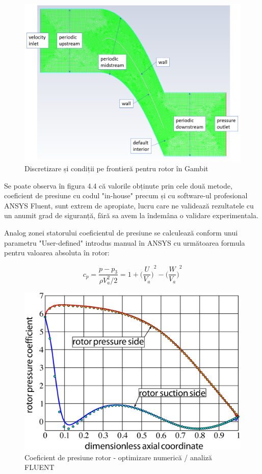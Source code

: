 \begin{figure}[h]
	\centering
	\includegraphics[scale=0.5]{figures/mesh-rotor-boundary.PNG}
	\caption{Discretizare și condiții pe frontieră pentru rotor în Gambit}
	\label{Discretizare și condiții pe frontieră pentru rotor în Gambit}
\end{figure}

Se poate observa în figura 4.4 că valorile obținute prin cele două metode, coeficient de presiune cu codul "in-house" precum și cu software-ul profesional ANSYS Fluent, sunt extrem de apropiate, lucru care ne validează rezultatele cu un anumit grad de siguranță, fără sa avem la îndemâna o validare experimentala.

Analog zonei statorului coeficientul de presiune se calculează conform unui parametru "User-defined" introdus manual în ANSYS cu următoarea formula pentru valoarea absoluta în rotor:

\begin{equation}
c_p = \frac{p-p_3}{\rho V_a^2 / 2} = 1 + {\Big(\frac{U}{V_a}\Big)}^2 - {\Big(\frac{W}{V_a}\Big)}^2
\end{equation}


\begin{figure}[t!]
	\centering
	\includegraphics[scale=0.4]{figures/cp-rotor-ezdraw.eps}
	\caption{Coeficient de presiune rotor - optimizare numerică / analiză FLUENT}
	\label{Coeficient de presiune rotor - optimizare numerică / analiză FLUENT}
\end{figure}

